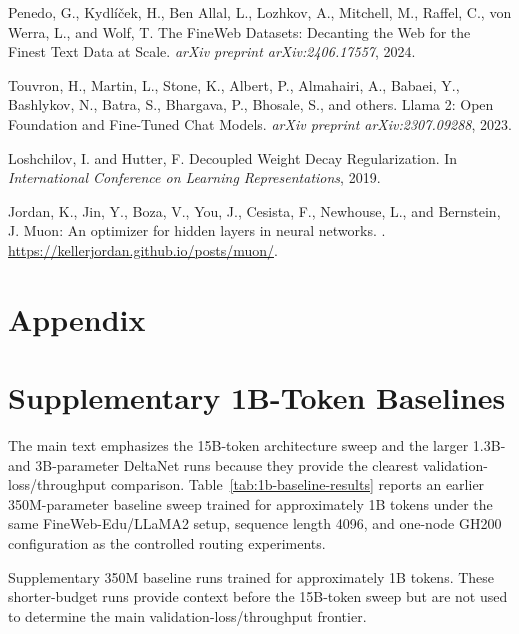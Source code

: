 \documentclass{article}
\begin{document}
\begin{thebibliography}{10}
Penedo, G., Kydl{\'i}{\v{c}}ek, H., Ben Allal, L., Lozhkov, A., Mitchell, M., Raffel, C., von Werra, L., and Wolf, T.
\newblock The FineWeb Datasets: Decanting the Web for the Finest Text Data at Scale.
\newblock \emph{arXiv preprint arXiv:2406.17557}, 2024.

Touvron, H., Martin, L., Stone, K., Albert, P., Almahairi, A., Babaei, Y., Bashlykov, N., Batra, S., Bhargava, P., Bhosale, S., and others.
\newblock Llama 2: Open Foundation and Fine-Tuned Chat Models.
\newblock \emph{arXiv preprint arXiv:2307.09288}, 2023.

Loshchilov, I. and Hutter, F.
\newblock Decoupled Weight Decay Regularization.
\newblock In \emph{International Conference on Learning Representations}, 2019.

Jordan, K., Jin, Y., Boza, V., You, J., Cesista, F., Newhouse, L., and Bernstein, J.
\newblock Muon: An optimizer for hidden layers in neural networks.
. \url{https://kellerjordan.github.io/posts/muon/}.

\end{thebibliography}

\clearpage
\appendix

\section*{Appendix}

\section{Supplementary 1B-Token Baselines}
\label{app:repo-results}

The main text emphasizes the 15B-token architecture sweep and the larger 1.3B- and 3B-parameter DeltaNet runs because they provide the clearest validation-loss/throughput comparison. Table~\ref{tab:1b-baseline-results} reports an earlier 350M-parameter baseline sweep trained for approximately 1B tokens under the same FineWeb-Edu/LLaMA2 setup, sequence length 4096, and one-node GH200 configuration as the controlled routing experiments.

\begin{table}[tbp]
    \centering
    \caption{Supplementary 350M baseline runs trained for approximately 1B tokens. These shorter-budget runs provide context before the 15B-token sweep but are not used to determine the main validation-loss/throughput frontier.}
    \label{tab:1b-baseline-results}
    \resizebox{\linewidth}{!}{}
\end{table}
\end{document}
